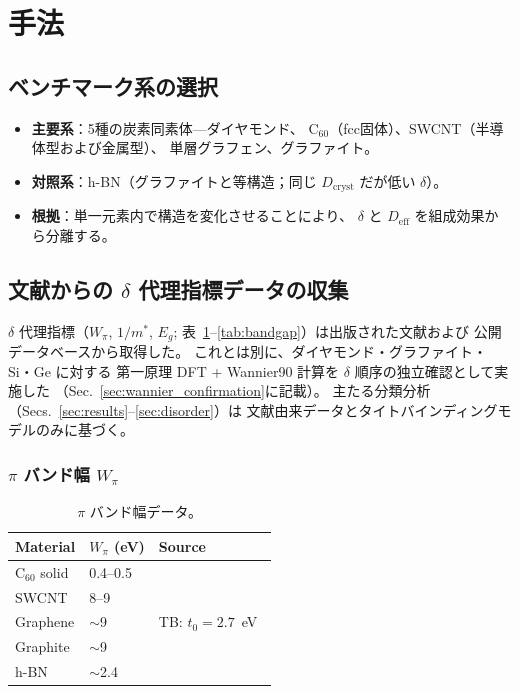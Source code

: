 \documentclass[twocolumn,showpacs,preprintnumbers,amsmath,amssymb,prb]{revtex4-2}
\begin{document}
\section{手法}
\label{sec:methods}

\subsection{ベンチマーク系の選択}

\begin{itemize}
  \item \textbf{主要系}：5種の炭素同素体---ダイヤモンド、
    C$_{60}$（fcc固体）、SWCNT（半導体型および金属型）、
    単層グラフェン、グラファイト。
  \item \textbf{対照系}：h-BN（グラファイトと等構造；同じ
    $D_\mathrm{cryst}$ だが低い $\delta$）。
  \item \textbf{根拠}：単一元素内で構造を変化させることにより、
    $\delta$ と $D_\mathrm{eff}$ を組成効果から分離する。
\end{itemize}

\subsection{文献からの $\delta$ 代理指標データの収集}

$\delta$ 代理指標（$W_\pi$, $1/m^*$, $E_g$;
表~\ref{tab:bandwidth}--\ref{tab:bandgap}）は出版された文献および
公開データベースから取得した。
これとは別に、ダイヤモンド・グラファイト・Si・Ge に対する
第一原理 DFT + Wannier90 計算を $\delta$ 順序の独立確認として実施した
（Sec.~\ref{sec:wannier_confirmation}に記載）。
主たる分類分析（Secs.~\ref{sec:results}--\ref{sec:disorder}）は
文献由来データとタイトバインディングモデルのみに基づく。

\subsubsection{$\pi$ バンド幅 $W_\pi$}

\begin{table}[h]
\caption{$\pi$ バンド幅データ。}
\label{tab:bandwidth}
\begin{ruledtabular}
\begin{tabular}{lll}
  Material & $W_\pi$ (eV) & Source \\
  \hline
  C$_{60}$ solid & 0.4--0.5 & \cite{Gunnarsson1997} \\
  SWCNT & 8--9 & \cite{Reich2002} \\
  Graphene & $\sim$9 & TB: $t_0 = 2.7$~eV~\cite{Saito1998} \\
  Graphite & $\sim$9 & \cite{Reich2002} \\
  h-BN & $\sim$2.4 & \cite{Wirtz2005} \\
\end{tabular}
\end{ruledtabular}
\end{table}
\end{document}
